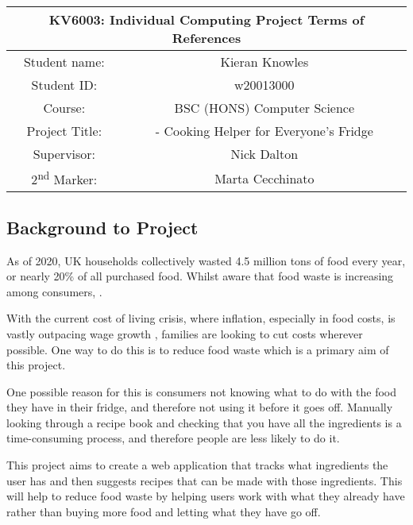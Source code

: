 \documentclass[../CHEFCookingHelper.tex]{subfiles}
\begin{document}
\begin{table}[h!]
    \centering
    \begin{tabular}{|c|c|}
        \hline
        \multicolumn{2}{|c|}{KV6003: Individual Computing Project Terms of References} \\\hline
        Student name: & Kieran Knowles \\\hline
        Student ID: & w20013000 \\\hline
        Course: & BSC (HONS) Computer Science \\\hline
        Project Title: & \chef{} - Cooking Helper for Everyone's Fridge \\\hline
        Supervisor: & Nick Dalton \\\hline
        2\textsuperscript{nd} Marker: & Marta Cecchinato \\\hline
    \end{tabular}
\end{table}

\subsection{Background to Project}
As of 2020, UK households collectively wasted 4.5 million tons of food every year, or nearly 20\% of all purchased food.
Whilst aware that food waste is increasing among consumers,  \cite{wrap_uk_2020}.

With the current cost of living crisis, where inflation, especially in food costs, is vastly outpacing wage growth \cite{office_for_national_statistics_average_2023}
\cite{francis-devine_rising_2023}, families are looking to cut costs wherever possible. One way to do this is to reduce food waste which is a
primary aim of this project.

One possible reason for this is consumers not knowing what to do with the food they have in their fridge, and therefore not using it before it goes off.
Manually looking through a recipe book and checking that you have all the ingredients is a time-consuming process, and therefore people are less likely to do it.

This project aims to create a web application that tracks what ingredients the user has and then suggests recipes that can be made with those ingredients.
This will help to reduce food waste by helping users work with what they already have rather than buying more food and letting what they have go off.
\end{document}
